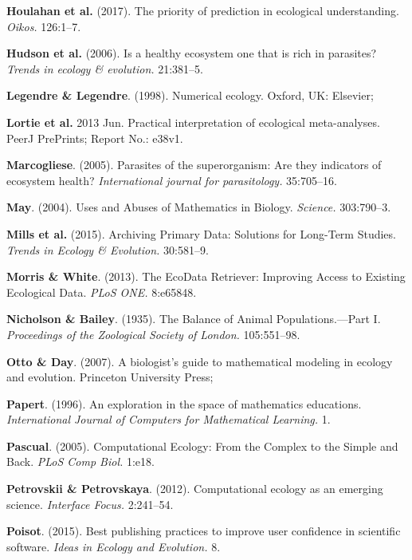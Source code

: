 \documentclass[11pt,serif]{article}
\begin{document}
\hypertarget{ref-HouMcK17}{}
\textbf{Houlahan et al.} (2017). The priority of prediction in
ecological understanding. \emph{Oikos.} 126:1--7.

\hypertarget{ref-HudDob06}{}
\textbf{Hudson et al.} (2006). Is a healthy ecosystem one that is rich
in parasites? \emph{Trends in ecology \& evolution.} 21:381--5.

\hypertarget{ref-LegLeg98}{}
\textbf{Legendre \& Legendre}. (1998). Numerical ecology. Oxford, UK:
Elsevier;

\hypertarget{ref-LorSte13}{}
\textbf{Lortie et al.} 2013 Jun. Practical interpretation of ecological
meta-analyses. PeerJ PrePrints; Report No.: e38v1.

\hypertarget{ref-Mar05}{}
\textbf{Marcogliese}. (2005). Parasites of the superorganism: Are they
indicators of ecosystem health? \emph{International journal for
parasitology.} 35:705--16.

\hypertarget{ref-May04}{}
\textbf{May}. (2004). Uses and Abuses of Mathematics in Biology.
\emph{Science.} 303:790--3.

\hypertarget{ref-MilTep15}{}
\textbf{Mills et al.} (2015). Archiving Primary Data: Solutions for
Long-Term Studies. \emph{Trends in Ecology \& Evolution.} 30:581--9.

\hypertarget{ref-MorWhi13}{}
\textbf{Morris \& White}. (2013). The EcoData Retriever: Improving
Access to Existing Ecological Data. \emph{PLoS ONE.} 8:e65848.

\hypertarget{ref-NicBai35}{}
\textbf{Nicholson \& Bailey}. (1935). The Balance of Animal
Populations.---Part I. \emph{Proceedings of the Zoological Society of
London.} 105:551--98.

\hypertarget{ref-OttDay07}{}
\textbf{Otto \& Day}. (2007). A biologist's guide to mathematical
modeling in ecology and evolution. Princeton University Press;

\hypertarget{ref-Pap96}{}
\textbf{Papert}. (1996). An exploration in the space of mathematics
educations. \emph{International Journal of Computers for Mathematical
Learning.} 1.

\hypertarget{ref-Pas05}{}
\textbf{Pascual}. (2005). Computational Ecology: From the Complex to the
Simple and Back. \emph{PLoS Comp Biol.} 1:e18.

\hypertarget{ref-PetPet12}{}
\textbf{Petrovskii \& Petrovskaya}. (2012). Computational ecology as an
emerging science. \emph{Interface Focus.} 2:241--54.

\hypertarget{ref-Poi15}{}
\textbf{Poisot}. (2015). Best publishing practices to improve user
confidence in scientific software. \emph{Ideas in Ecology and
Evolution.} 8.
\end{document}
